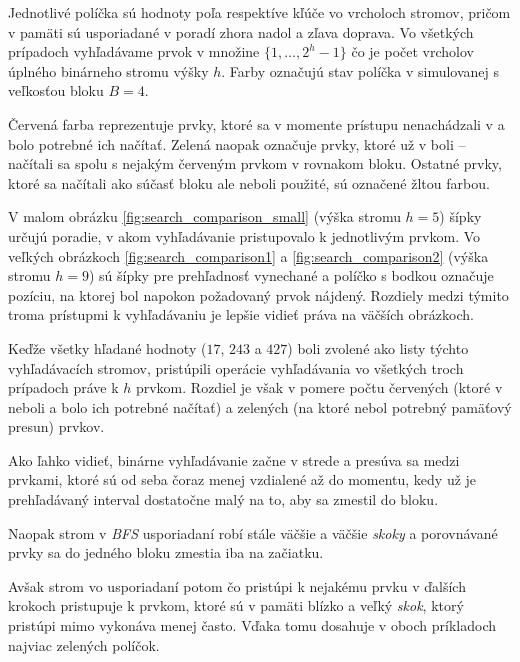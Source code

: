 Jednotlivé políčka sú hodnoty poľa respektíve kľúče vo vrcholoch stromov, pričom v pamäti sú usporiadané v poradí zhora nadol a zľava doprava. Vo všetkých prípadoch vyhľadávame prvok v množine $\{1, \dotsc, 2^h-1\}$ čo je počet vrcholov úplného binárneho stromu výšky $h$. Farby označujú stav políčka v simulovanej \cache s veľkosťou bloku $B=4$. 


Červená farba reprezentuje prvky, ktoré sa v momente prístupu nenachádzali v \cache a bolo potrebné ich načítať. Zelená naopak označuje prvky, ktoré už v \cache boli -- načítali sa spolu s nejakým červeným prvkom v rovnakom bloku. Ostatné prvky, ktoré sa načítali ako súčasť bloku ale neboli použité, sú označené žltou farbou.

V malom obrázku \ref{fig:search_comparison_small} (výška stromu $h=5$) šípky určujú poradie, v akom vyhľadávanie pristupovalo k jednotlivým prvkom. Vo veľkých obrázkoch \ref{fig:search_comparison1} a \ref{fig:search_comparison2} (výška stromu $h=9$) sú šípky pre prehľadnosť vynechané a políčko s bodkou označuje pozíciu, na ktorej bol napokon požadovaný prvok nájdený. Rozdiely medzi týmito troma prístupmi k vyhľadávaniu je lepšie vidieť práva na väčších obrázkoch.

Keďže všetky hľadané hodnoty ($17$, $243$ a $427$) boli zvolené ako listy týchto vyhľadávacích stromov, pristúpili operácie vyhľadávania vo všetkých troch prípadoch práve k $h$ prvkom. Rozdiel je však v pomere počtu červených (ktoré v \cache neboli a bolo ich potrebné načítať) a zelených (na ktoré nebol potrebný pamäťový presun) prvkov.

Ako ľahko vidieť, binárne vyhľadávanie začne v strede a presúva sa medzi prvkami, ktoré sú od seba  čoraz menej vzdialené až do momentu, kedy už je prehľadávaný interval dostatočne malý na to, aby sa zmestil do bloku.

Naopak strom v \emph{BFS} usporiadaní robí stále väčšie a väčšie \emph{skoky} a porovnávané prvky sa do jedného bloku zmestia iba na začiatku.

Avšak strom vo \vEB usporiadaní potom čo pristúpi k nejakému prvku v ďalších krokoch pristupuje k prvkom, ktoré sú v pamäti blízko a veľký \emph{skok}, ktorý pristúpi mimo \cache vykonáva menej často. Vďaka tomu dosahuje v oboch príkladoch najviac zelených políčok.

%


